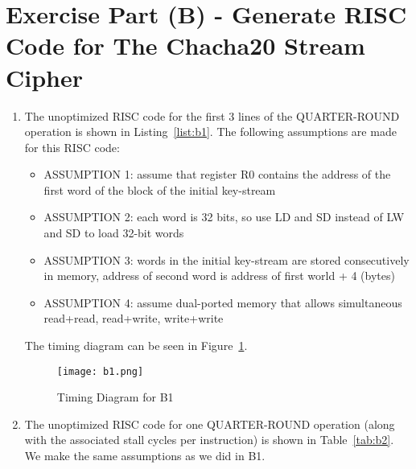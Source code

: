 \section*{Exercise Part (B) - Generate RISC Code for The Chacha20 Stream Cipher}

\begin{enumerate}[wide, label=(B\arabic*)]

\item The unoptimized RISC code for the first 3 lines of the QUARTER-ROUND operation is shown in Listing~\ref{list:b1}. The following assumptions are made for this RISC code:
\begin{itemize}
	\item ASSUMPTION 1: assume that register R0 contains the address of the first word of the block of the initial key-stream
	\item ASSUMPTION 2: each word is 32 bits, so use LD and SD instead of LW and SD to load 32-bit words
	\item ASSUMPTION 3: words in the initial key-stream are stored consecutively in memory, address of second word is address of first world + 4 (bytes)
	\item ASSUMPTION 4: assume dual-ported memory that allows simultaneous read+read, read+write, write+write
\end{itemize}

The timing diagram can be seen in Figure~\ref{fig:B1}. %

\begin{figure}[htp]
	\centering
	\texttt{[image: b1.png]}
	\caption{\label{fig:B1}Timing Diagram for B1}
\end{figure}

\item The unoptimized RISC code for one QUARTER-ROUND operation (along with the associated stall cycles per instruction) is shown in Table~\ref{tab:b2}. We make the same assumptions as we did in B1.



\end{enumerate}
